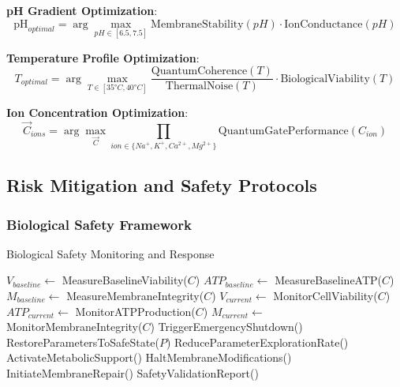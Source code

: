 ﻿\documentclass[11pt,a4paper]{article}
\begin{document}
\textbf{pH Gradient Optimization}:
\begin{equation}
\text{pH}_{optimal} = \arg\max_{pH \in [6.5, 7.5]} \text{MembraneStability}(pH) \cdot \text{IonConductance}(pH)
\end{equation}

\textbf{Temperature Profile Optimization}:
\begin{equation}
T_{optimal} = \arg\max_{T \in [35°C, 40°C]} \frac{\text{QuantumCoherence}(T)}{\text{ThermalNoise}(T)} \cdot \text{BiologicalViability}(T)
\end{equation}

\textbf{Ion Concentration Optimization}:
\begin{equation}
\vec{C}_{ions} = \arg\max_{\vec{C}} \prod_{ion \in \{Na^+, K^+, Ca^{2+}, Mg^{2+}\}} \text{QuantumGatePerformance}(C_{ion})
\end{equation}

\subsection{Risk Mitigation and Safety Protocols}

\subsubsection{Biological Safety Framework}

\begin{algorithm}
\caption{Biological Safety Monitoring and Response}
\begin{algorithmic}
    \State $V_{baseline} \leftarrow$ MeasureBaselineViability($C$)
    \State $ATP_{baseline} \leftarrow$ MeasureBaselineATP($C$)
    \State $M_{baseline} \leftarrow$ MeasureMembraneIntegrity($C$)
        \State $V_{current} \leftarrow$ MonitorCellViability($C$)
        \State $ATP_{current} \leftarrow$ MonitorATPProduction($C$)
        \State $M_{current} \leftarrow$ MonitorMembraneIntegrity($C$)
            \State TriggerEmergencyShutdown()
            \State RestoreParametersToSafeState($P$)
        \EndIf
            \State ReduceParameterExplorationRate()
            \State ActivateMetabolicSupport()
        \EndIf
            \State HaltMembraneModifications()
            \State InitiateMembraneRepair()
        \EndIf
    \EndWhile
    \State \Return SafetyValidationReport()
\EndProcedure
\end{algorithmic}
\end{algorithm}
\end{document}
